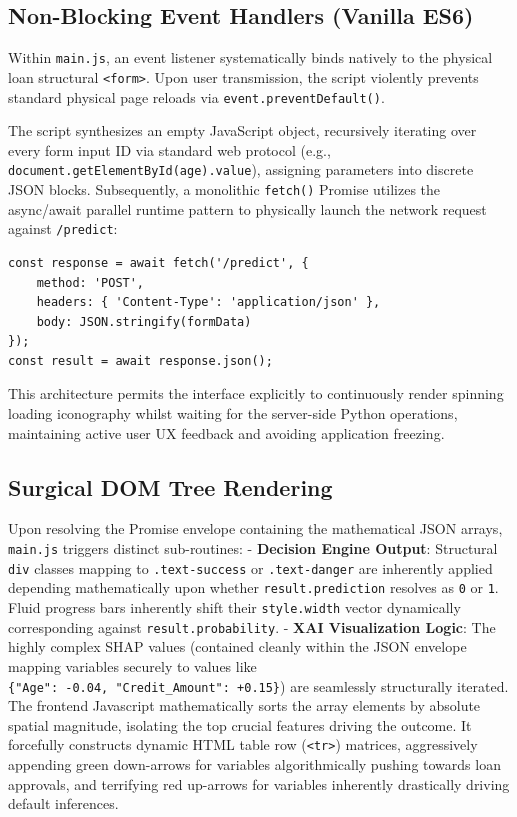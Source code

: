 \hypertarget{non-blocking-event-handlers-vanilla-es6}{%
\subsection{Non-Blocking Event Handlers (Vanilla
ES6)}\label{non-blocking-event-handlers-vanilla-es6}}

Within \texttt{main.js}, an event listener systematically binds natively
to the physical loan structural \texttt{\textless{}form\textgreater{}}.
Upon user transmission, the script violently prevents standard physical
page reloads via \texttt{event.preventDefault()}.

The script synthesizes an empty JavaScript object, recursively iterating
over every form input ID via standard web protocol (e.g.,
\texttt{document.getElementById(\textquotesingle{}age\textquotesingle{}).value}),
assigning parameters into discrete JSON blocks. Subsequently, a
monolithic \texttt{fetch()} Promise utilizes the async/await parallel
runtime pattern to physically launch the network request against
\texttt{/predict}:

\begin{verbatim}
const response = await fetch('/predict', {
    method: 'POST',
    headers: { 'Content-Type': 'application/json' },
    body: JSON.stringify(formData)
});
const result = await response.json();
\end{verbatim}

This architecture permits the interface explicitly to continuously
render spinning loading iconography whilst waiting for the server-side
Python operations, maintaining active user UX feedback and avoiding
application freezing.

\hypertarget{surgical-dom-tree-rendering}{%
\subsection{Surgical DOM Tree
Rendering}\label{surgical-dom-tree-rendering}}

Upon resolving the Promise envelope containing the mathematical JSON
arrays, \texttt{main.js} triggers distinct sub-routines: -
\textbf{Decision Engine Output}: Structural \texttt{div} classes mapping
to \texttt{.text-success} or \texttt{.text-danger} are inherently
applied depending mathematically upon whether \texttt{result.prediction}
resolves as \texttt{0} or \texttt{1}. Fluid progress bars inherently
shift their \texttt{style.width} vector dynamically corresponding
against \texttt{result.probability}. - \textbf{XAI Visualization Logic}:
The highly complex SHAP values (contained cleanly within the JSON
envelope mapping variables securely to values like
\texttt{\{"Age":\ -0.04,\ "Credit\_Amount":\ +0.15\}}) are seamlessly
structurally iterated. The frontend Javascript mathematically sorts the
array elements by absolute spatial magnitude, isolating the top crucial
features driving the outcome. It forcefully constructs dynamic HTML
table row (\texttt{\textless{}tr\textgreater{}}) matrices, aggressively
appending green down-arrows for variables algorithmically pushing
towards loan approvals, and terrifying red up-arrows for variables
inherently drastically driving default inferences.

